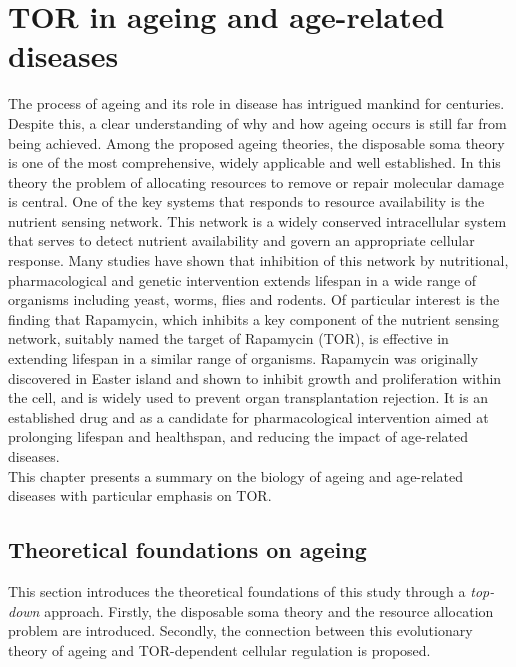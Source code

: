 \graphicspath{{Chapter2/Chapter2Figs/}}

\chapter{TOR in ageing and age-related diseases}
\label{chap:TOR in ageing and age-related diseases}
The process of ageing and its role in disease has intrigued mankind for centuries. Despite this, a clear understanding of why and how ageing occurs is still far from being achieved. Among the proposed ageing theories, the disposable soma theory is one of the most comprehensive, widely applicable and well established. In this theory the problem of allocating resources to remove or repair molecular damage is central. One of the key systems that responds to resource availability is the nutrient sensing network. This network is a widely conserved intracellular system that serves to detect nutrient availability and govern an appropriate cellular response. Many studies have shown that inhibition of this network by nutritional, pharmacological and genetic intervention extends lifespan in a wide range of organisms including yeast, worms, flies and rodents. Of particular interest is the finding that Rapamycin, which inhibits a key component of the nutrient sensing network, suitably named the target of Rapamycin (TOR),
 is effective in extending lifespan in a similar range of organisms. Rapamycin was originally discovered in Easter island and shown to inhibit growth and proliferation within the cell, and is widely used to prevent organ transplantation rejection. It is an established drug and as a candidate for pharmacological intervention aimed at prolonging lifespan and healthspan, and reducing the impact of age-related diseases.\\
This chapter presents a summary on the biology of ageing and age-related diseases with particular emphasis on TOR.


\section{Theoretical foundations on ageing}
\label{sec:Theoretical foundations on ageing}
This section introduces the theoretical foundations of this study through a \emph{top-down} approach. Firstly, the disposable soma theory and the resource allocation problem are introduced. Secondly, the connection between this evolutionary theory of ageing and TOR-dependent cellular regulation is proposed.

